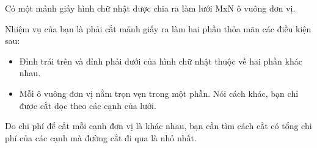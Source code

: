 Có một mảnh giấy hình chữ nhật được chia ra làm lưới MxN ô vuông đơn vị.

Nhiệm vụ của bạn là phải cắt mảnh giấy ra làm hai phần thỏa mãn các điều kiện sau:
\begin{itemize}
	\item Đỉnh trái trên và đỉnh phải dưới của hình chữ nhật thuộc về hai phần khác nhau.
	\item Mỗi ô vuông đơn vị nằm trọn vẹn trong một phần. Nói cách khác, bạn chỉ được cắt dọc theo các cạnh của lưới.
\end{itemize}

Do chi phí để cắt mỗi cạnh đơn vị là khác nhau, bạn cần tìm cách cắt có tổng chi phí của các cạnh mà đường cắt đi qua là nhỏ nhất.

\